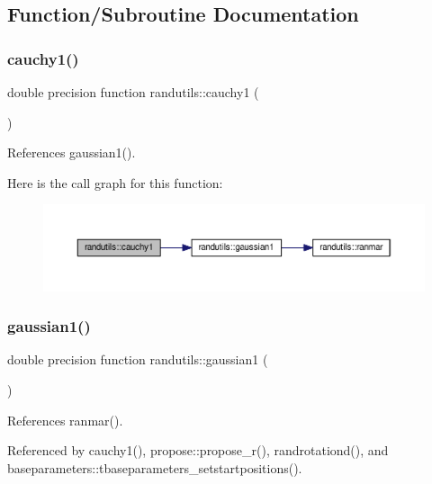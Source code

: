 \subsection{Function/\+Subroutine Documentation}
\mbox{\label{namespacerandutils_a6a11e93bb549c94d47ae94f4e6ac8c49}} 
\subsubsection{\texorpdfstring{cauchy1()}{cauchy1()}}
{\footnotesize\ttfamily double precision function randutils\+::cauchy1 (\begin{DoxyParamCaption}{ }\end{DoxyParamCaption})}



References gaussian1().

Here is the call graph for this function\+:
\nopagebreak
\begin{figure}[H]
\begin{center}
\leavevmode
\includegraphics[width=350pt]{namespacerandutils_a6a11e93bb549c94d47ae94f4e6ac8c49_cgraph}
\end{center}
\end{figure}
\mbox{\label{namespacerandutils_a9279fa2584213af31977f47ef3ea77e7}} 
\subsubsection{\texorpdfstring{gaussian1()}{gaussian1()}}
{\footnotesize\ttfamily double precision function randutils\+::gaussian1 (\begin{DoxyParamCaption}{ }\end{DoxyParamCaption})}



References ranmar().



Referenced by cauchy1(), propose\+::propose\+\_\+r(), randrotationd(), and baseparameters\+::tbaseparameters\+\_\+setstartpositions().

